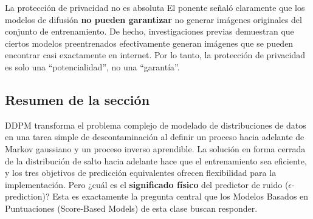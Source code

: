 \begin{warningbox}{La protección de privacidad no es absoluta}
El ponente señaló claramente que los modelos de difusión \textbf{no pueden garantizar} no generar imágenes originales del conjunto de entrenamiento. De hecho, investigaciones previas demuestran que ciertos modelos preentrenados efectivamente generan imágenes que se pueden encontrar casi exactamente en internet. Por lo tanto, la protección de privacidad es solo una ``potencialidad'', no una ``garantía''.
\end{warningbox}

\subsection{Resumen de la sección}

DDPM transforma el problema complejo de modelado de distribuciones de datos en una tarea simple de descontaminación al definir un proceso hacia adelante de Markov gaussiano y un proceso inverso aprendible. La solución en forma cerrada de la distribución de salto hacia adelante hace que el entrenamiento sea eficiente, y los tres objetivos de predicción equivalentes ofrecen flexibilidad para la implementación. Pero ¿cuál es el \textbf{significado físico} del predictor de ruido ($\epsilon$-prediction)? Esta es exactamente la pregunta central que los Modelos Basados en Puntuaciones (Score-Based Models) de esta clase buscan responder.


